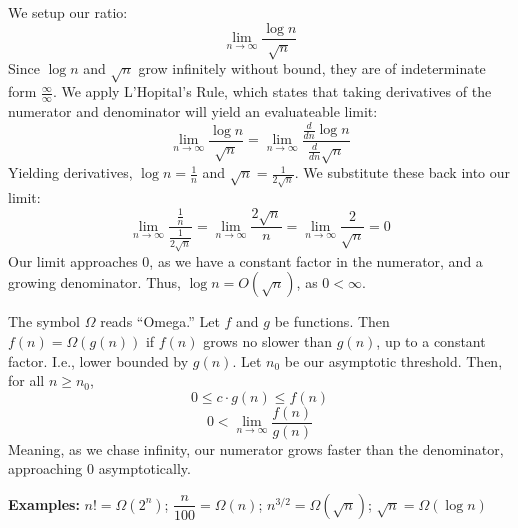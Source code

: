 \begin{Proof}[$\log n = O(\sqrt{n})$]

    \label{proof:logn}
We setup our ratio:
\[\lim_{n\to\infty}\dfrac{\log n}{\sqrt{n}}\]
\noindent
Since $\log n$ and $\sqrt{n}$ grow infinitely without bound, they are of indeterminate form $\frac{\infty}{\infty}$. We apply L'Hopital's Rule, which states
that taking derivatives of the numerator and denominator will yield an evaluateable limit:
\Large
\[\lim_{n\to\infty}\dfrac{\log n}{\sqrt{n}}=\lim_{n\to\infty}\dfrac{\frac{d}{dn}\log n}{\frac{d}{dn}\sqrt{n}}\]
\normalsize
\noindent
Yielding derivatives, $\log n = \frac{1}{n}$ and $\sqrt{n}=\frac{1}{2\sqrt{n}}$. We substitute these back into our limit:
\Large
\[\lim_{n\to\infty}\dfrac{\frac{1}{n}}{\frac{1}{2\sqrt{n}}}=\lim_{n\to\infty}\dfrac{2\sqrt{n}}{n}=\lim_{n\to\infty}\dfrac{2}{\sqrt{n}}=0\]
\normalsize
\noindent
Our limit approaches 0, as we have a constant factor in the numerator, and a growing denominator. Thus, $\log n = O(\sqrt{n})$, as $0<\infty$.
\end{Proof}

\begin{Def}

    \label{def:bigOmega}

    The symbol $\Omega$ reads ``Omega.'' Let $f$ and $g$ be functions. Then 
    $f(n)=\Omega(g(n))$ if $f(n)$ grows no slower than $g(n)$, up to a constant factor. I.e.,
    lower bounded by $g(n)$. Let $n_0$ be our asymptotic threshold. Then, for all $n\geq n_0$,
    \large
    \[0\leq c\cdot g(n) \leq f(n)\]
    \[0<\lim_{n\to\infty}\dfrac{f(n)}{g(n)}\]
    \normalsize
    \noindent
    Meaning, as we chase infinity, our numerator grows faster than the denominator, approaching 0 asymptotically.
\end{Def}

\noindent
\textbf{Examples:} $n!=\Omega(2^n)$; $\dfrac{n}{100}= \Omega(n)$; $n^{3/2}= \Omega(\sqrt{n})$; $\sqrt{n} = \Omega(\log n)$

\newpage

